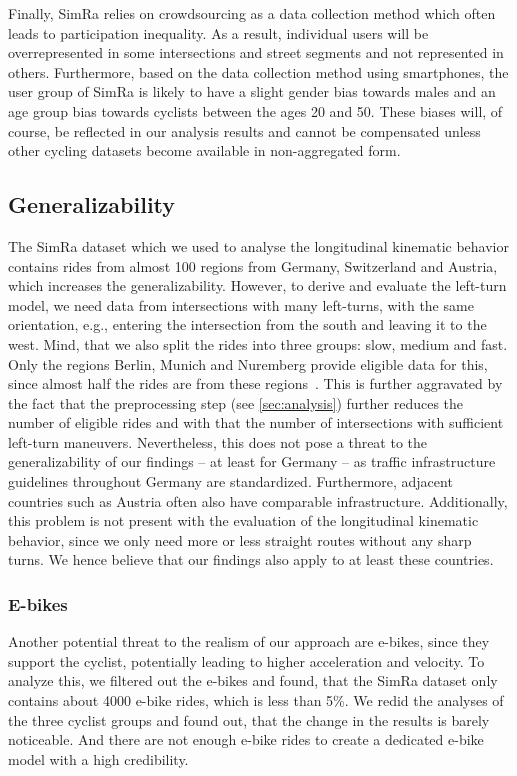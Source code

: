 Finally, SimRa relies on crowdsourcing as a data collection method which often leads to participation inequality.
As a result, individual users will be overrepresented in some intersections and street segments and not represented in others.
Furthermore, based on the data collection method using smartphones, the user group of SimRa is likely to have a slight gender bias towards males and an age group bias towards cyclists between the ages \num{20} and \num{50}.
These biases will, of course, be reflected in our analysis results and cannot be compensated unless other cycling datasets become available in non-aggregated form.

\subsection{Generalizability}%
\label{sec:problem_general}
The SimRa dataset which we used to analyse the longitudinal kinematic behavior contains rides from almost \num{100} regions from Germany, Switzerland and Austria, which increases the generalizability.
However, to derive and evaluate the left-turn model, we need data from intersections with many left-turns, with the same orientation, e.g., entering the intersection from the south and leaving it to the west.
Mind, that we also split the rides into three groups: slow, medium and fast.
Only the regions Berlin, Munich and Nuremberg provide eligible data for this, since almost half the rides are from these regions~\cite{karakaya2022cyclesense}.
This is further aggravated by the fact that the preprocessing step (see \cref{sec:analysis}) further reduces the number of eligible rides and with that the number of intersections with sufficient left-turn maneuvers.
Nevertheless, this does not pose a threat to the generalizability of our findings -- at least for Germany -- as traffic infrastructure guidelines throughout Germany are standardized.
Furthermore, adjacent countries such as Austria often also have comparable infrastructure.
Additionally, this problem is not present with the evaluation of the longitudinal kinematic behavior, since we only need more or less straight routes without any sharp turns.
We hence believe that our findings also apply to at least these countries.

\subsubsection{E-bikes}
\label{subsubsec:e-bikes}
Another potential threat to the realism of our approach are e-bikes, since they support the cyclist, potentially leading to higher acceleration and velocity.
To analyze this, we filtered out the e-bikes and found, that the SimRa dataset only contains about \num{4000} e-bike rides, which is less than \num{5}\%.
We redid the analyses of the three cyclist groups and found out, that the change in the results is barely noticeable.
And there are not enough e-bike rides to create a dedicated e-bike model with a high credibility.


